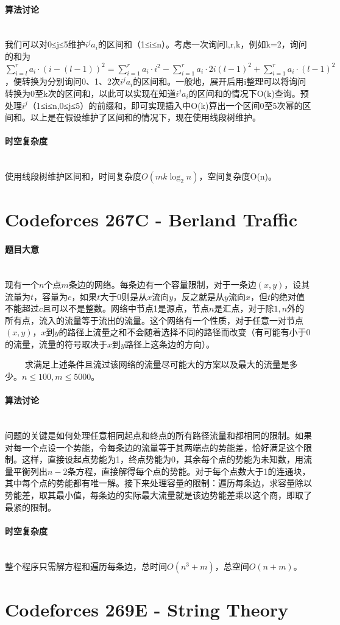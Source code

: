 \documentclass[UTF8]{ctexart}
\newcommand{\myparagraph}[1]{\paragraph{#1}\mbox{}\\}
\theoremstyle{nonumberplain}
\begin{document}
		\myparagraph{算法讨论}
		
			我们可以对0≤j≤5维护$i^j a_i$的区间和（1≤i≤n）。考虑一次询问l,r,k，例如k=2，询问的和为$\sum_{i=l}^r  a_i \cdot (i-(l-1))^2 = \sum_{i=1}^r  a_i \cdot i^2 - \sum_{i=1}^r  a_i \cdot 2i(l-1)^2 + \sum_{i=1}^r  a_i \cdot (l-1)^2$，便转换为分别询问0、1、2次$i^j a_i$的区间和。一般地，展开后用i整理可以将询问转换为0至k次的区间和，以此可以实现在知道$i^j a_i$的区间和的情况下O(k)查询。预处理$i^j$（1≤i≤n,0≤j≤5）的前缀和，即可实现插入中O(k)算出一个区间0至5次幂的区间和。以上是在假设维护了区间和的情况下，现在使用线段树维护。
			
		\myparagraph{时空复杂度}
			
			使用线段树维护区间和，时间复杂度$O(mk\log_2{n})$，空间复杂度O(n)。
	
	\section{Codeforces 267C - Berland Traffic}
	
		\myparagraph{题目大意}
		
			现有一个$n$个点$m$条边的网络。每条边有一个容量限制，对于一条边$(x,y)$，设其流量为$t$，容量为$c$，如果$t$大于0则是从$x$流向$y$，反之就是从$y$流向$x$，但$t$的绝对值不能超过$c$且可以不是整数。网络中节点1是源点，节点$n$是汇点，对于除$1,n$外的所有点，流入的流量等于流出的流量。这个网络有一个性质，对于任意一对节点$(x,y)$，$x$到$y$的路径上流量之和不会随着选择不同的路径而改变（有可能有小于0的流量，流量的符号取决于$x$到$y$路径上这条边的方向）。
			
　　		求满足上述条件且流过该网络的流量尽可能大的方案以及最大的流量是多少。$n \leq 100, m \leq 5000$。
		
		\myparagraph{算法讨论}
		
			问题的关键是如何处理任意相同起点和终点的所有路径流量和都相同的限制。如果对每一个点设一个势能，令每条边的流量等于其两端点的势能差，恰好满足这个限制。这样，直接设起点势能为1，终点势能为0，其余每个点的势能为未知数，用流量平衡列出$n-2$条方程，直接解得每个点的势能。对于每个点数大于1的连通块，其中每个点的势能都有唯一解。接下来处理容量的限制：遍历每条边，求容量除以势能差，取其最小值，每条边的实际最大流量就是该边势能差乘以这个商，即取了最紧的限制。
		
		\myparagraph{时空复杂度}
		
			整个程序只需解方程和遍历每条边，总时间$O(n^3+m)$，总空间$O(n+m)$。
	
	\section{Codeforces 269E - String Theory}
	
\end{document}
